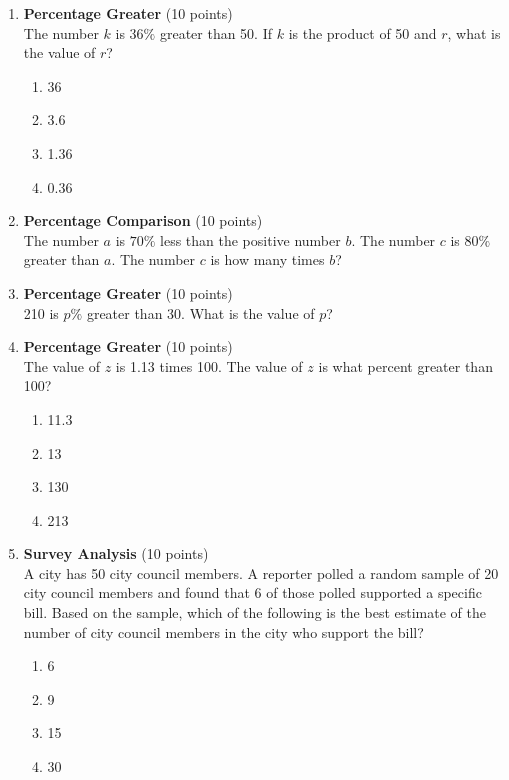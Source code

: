 \begin{enumerate}
  \item \textbf{Percentage Greater} (10 points)\\
  The number $k$ is $36\%$ greater than 50. If $k$ is the product of 50 and $r$, what is the value of $r$?
  \begin{enumerate}[label=(\Alph*)]
    \item 36
    \item 3.6
    \item 1.36
    \item 0.36
  \end{enumerate}
  \begin{subanswer}
  \end{subanswer}

  \item \textbf{Percentage Comparison} (10 points)\\
  The number $a$ is $70\%$ less than the positive number $b$. The number $c$ is $80\%$ greater than $a$. The number $c$ is how many times $b$?
  \begin{subanswer}
  \end{subanswer}

  \item \textbf{Percentage Greater} (10 points)\\
  210 is $p\%$ greater than 30. What is the value of $p$?
  \begin{subanswer}
  \end{subanswer}

  \item \textbf{Percentage Greater} (10 points)\\
  The value of $z$ is 1.13 times 100. The value of $z$ is what percent greater than 100?
  \begin{enumerate}[label=(\Alph*)]
    \item 11.3
    \item 13
    \item 130
    \item 213
  \end{enumerate}
  \begin{subanswer}
  \end{subanswer}

  \item \textbf{Survey Analysis} (10 points)\\
  A city has 50 city council members. A reporter polled a random sample of 20 city council members and found that 6 of those polled supported a specific bill. Based on the sample, which of the following is the best estimate of the number of city council members in the city who support the bill?
  \begin{enumerate}[label=(\Alph*)]
    \item 6
    \item 9
    \item 15
    \item 30
  \end{enumerate}
  \begin{subanswer}
  \end{subanswer}


\end{enumerate}
